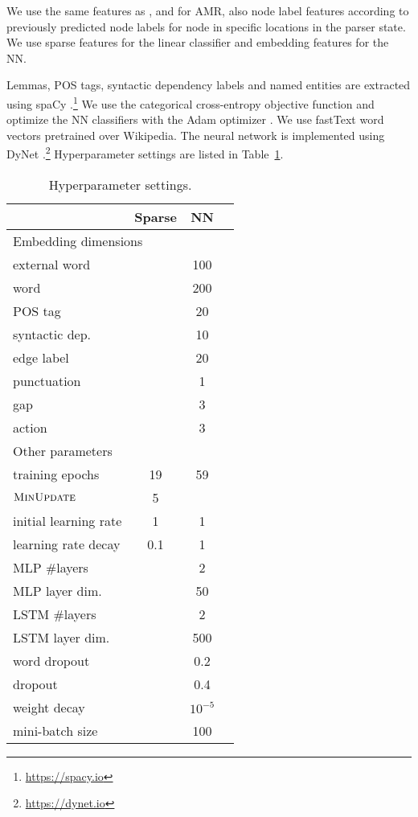 \documentclass[11pt,a4paper]{article}
\begin{document}
We use the same features as \citet{hershcovich2017a}, and for AMR, also node label features according to
previously predicted node labels for node in specific locations in the parser state.
We use sparse features for the linear classifier and embedding features for the NN.

Lemmas, POS tags, syntactic dependency labels and named entities are extracted using spaCy
\cite{spacy2}.\footnote{\url{https://spacy.io}}
We use the categorical cross-entropy objective function and optimize the
NN classifiers with the Adam optimizer \cite{kingma2014adam}.
We use fastText word vectors \cite{bojanowski2016enriching} pretrained over Wikipedia.
The neural network is implemented using DyNet \cite{neubig2017dynet}.\footnote{\url{https://dynet.io}}
Hyperparameter settings are listed in Table~\ref{tab:hyperparams}.

\begin{table}
\begin{tabular}{l|ccc}
& Sparse & NN \\
\hline
\multicolumn{3}{l}{\footnotesize Embedding dimensions} \\
external word & & 100 \\
word & & 200 \\
POS tag & & 20 \\
syntactic dep. & & 10 \\
edge label & & 20 \\
punctuation & & 1 \\
gap & & 3 \\
action & & 3 \\
\hline
\multicolumn{3}{l}{\footnotesize Other parameters} \\
training epochs & 19 & 59 \\
$\textsc{MinUpdate}$ & 5 \\
initial learning rate & 1 & 1 \\
learning rate decay & 0.1 & 1 \\
MLP \#layers & & 2 \\
MLP layer dim. & & 50 \\
LSTM \#layers & & 2 \\
LSTM layer dim. & & 500 \\
word dropout & & 0.2 \\
dropout & & 0.4 \\
weight decay & & $10^{-5}$ \\
mini-batch size & & 100
\end{tabular}
\caption{Hyperparameter settings.\label{tab:hyperparams}}
\end{table}
\end{document}
